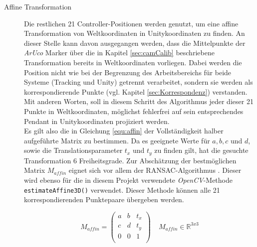 \begin{description}
\item[Affine Transformation] Die restlichen 21 Controller-Positionen werden genutzt, um eine affine Transformation von Weltkoordinaten in Unitykoordinaten zu finden. An dieser Stelle kann davon ausgegangen werden, dass die Mittelpunkte der \textit{ArUco} Marker über die in Kapitel \ref{sec:camCalib} beschriebene Transformation bereits in Weltkoordinaten vorliegen. Dabei werden die Position nicht wie bei der Begrenzung des Arbeitsbereichs für beide Systeme (Tracking und Unity) getrennt verarbeitet, sondern sie werden als korrespondierende Punkte (vgl. Kapitel \ref{sec:Korrespondenz}) verstanden. Mit anderen Worten, soll in diesem Schritt des Algorithmus jeder dieser 21 Punkte in Weltkoordinaten, möglichst fehlerfrei auf sein entsprechendes Pendant in Unitykoordinaten projiziert werden. \\
Es gilt also die in Gleichung \ref{equ:affin} der Vollständigkeit halber aufgeführte Matrix zu bestimmen. Da es geeignete Werte für $a, b, c$ und $d$, sowie die Translationsparameter $t_x$ und $t_y$ zu finden gilt, hat die gesuchte Transformation 6 Freiheitsgrade. Zur Abschätzung der bestmöglichen Matrix $M_{affin}$ eignet sich vor allem der RANSAC-Algorithmus \cite{articel:RANSAC}. Dieser wird ebenso für die in diesem Projekt verwendete \textit{OpenCV}-Methode \texttt{estimateAffine3D()} verwendet. Dieser Methode können alle 21 korrespondierenden Punktepaare übergeben werden. 

\begin{equation}
\label{equ:affin}
M_{affin} = 
\begin{pmatrix}
a & b & t_x \\
c & d & t_y \\
0 & 0 & 1  \\
\end{pmatrix} 
~ ~ ~ ~ ~M_{affin} \in \mathbb{R}^{3x3}
\end{equation}
\end{description}

